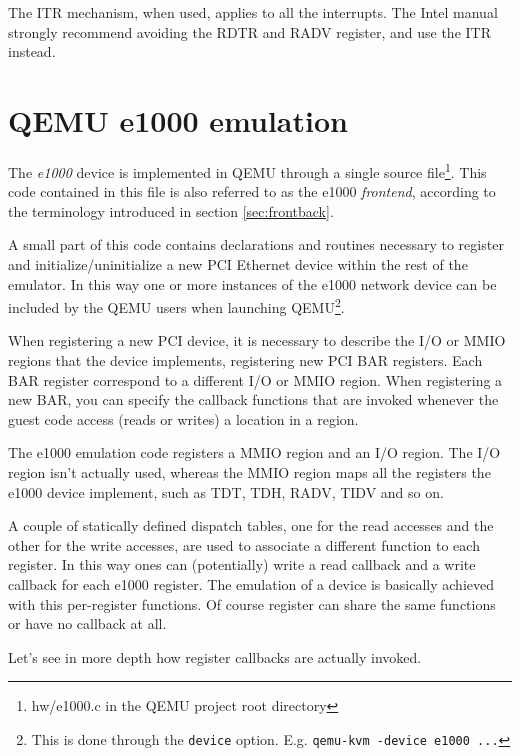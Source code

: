 \vspace{0.5cm}

The ITR mechanism, when used, applies to all the interrupts. The Intel manual strongly recommend avoiding the RDTR and RADV register,
and use the ITR instead.



\section{QEMU e1000 emulation}
The \emph{e1000} device is implemented in QEMU through a single source file\footnote{hw/e1000.c in the QEMU project root directory}.
This code contained in this file is also referred to as the e1000 \emph{frontend}, according to the terminology introduced in section
\ref{sec:frontback}.

A small part of this code contains declarations and routines necessary to register and initialize/uninitialize a new PCI Ethernet 
device within the rest of the emulator. In this way one or more instances of the e1000 network device can be included by the QEMU users
when launching QEMU\footnote{This is done through the \texttt{device} option. E.g. \texttt{qemu-kvm -device e1000 ...} }.

When registering a new PCI device, it is necessary to describe the I/O or MMIO regions that the device implements, registering new
PCI BAR registers. Each BAR register correspond to a different I/O or MMIO region.
When registering a new BAR, you can specify the callback functions that are invoked whenever the guest code access (reads or writes)
a location in a region.

The e1000 emulation code registers a MMIO region and an I/O region. The I/O region isn't actually used, whereas
the MMIO region maps all the registers the e1000 device implement, such as TDT, TDH, RADV, TIDV and so on.

A couple of statically defined dispatch tables, one for the read accesses and the other for the write accesses, are used to associate a
different function to each register.
In this way ones can (potentially) write a read callback and a write callback for each e1000 register.
The emulation of a device is basically achieved with this per-register functions. Of course register can share the same functions or have
no callback at all.

\vspace{0.5cm}
Let's see in more depth how register callbacks are actually invoked.

